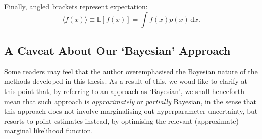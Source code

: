 Finally, angled brackets represent expectation:
\begin{equation}
	\langle f(x) \rangle \equiv \mathbb{E}[f(x)] = \int f(x) p(x) \, \mathrm{d}x. 
\end{equation}




\begin{mccorrection}
\section{A Caveat About Our `Bayesian' Approach}

Some readers may feel that the author overemphasised the Bayesian nature of the methods developed in this thesis. As a result of this, we woud like to clarify at this point that, by referring to an approach as `Bayesian', we shall henceforth mean that such approach is \emph{approximately} or \emph{partially} Bayesian, in the sense that this approach does not involve marginalising out hyperparameter uncertainty, but resorts to point estimates instead, by optimising the relevant (approximate) marginal likelihood function.

\end{mccorrection}